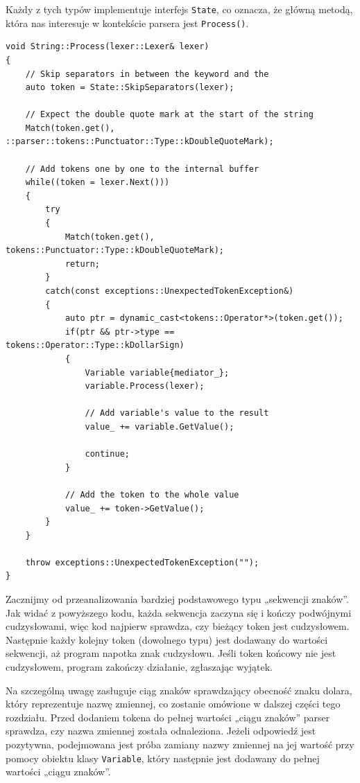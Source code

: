 Każdy z tych typów implementuje interfejs \texttt{State}, co oznacza, że główną metodą, która nas interesuje w kontekście parsera jest \texttt{Process()}.

\begin{lstlisting}[label=list:string,caption=Metoda String::Process(),basicstyle=\footnotesize\ttfamily]
void String::Process(lexer::Lexer& lexer)
{
    // Skip separators in between the keyword and the
    auto token = State::SkipSeparators(lexer);

    // Expect the double quote mark at the start of the string
    Match(token.get(), ::parser::tokens::Punctuator::Type::kDoubleQuoteMark);
    
    // Add tokens one by one to the internal buffer
    while((token = lexer.Next()))
    {
        try
        {
            Match(token.get(), tokens::Punctuator::Type::kDoubleQuoteMark);
            return;
        }
        catch(const exceptions::UnexpectedTokenException&)
        {
            auto ptr = dynamic_cast<tokens::Operator*>(token.get());
            if(ptr && ptr->type == tokens::Operator::Type::kDollarSign)
            {
                Variable variable{mediator_};
                variable.Process(lexer);
    
                // Add variable's value to the result
                value_ += variable.GetValue();
    
                continue;
            }
    
            // Add the token to the whole value
            value_ += token->GetValue();
        }
    }
    
    throw exceptions::UnexpectedTokenException("");
}
\end{lstlisting}

Zacznijmy od przeanalizowania bardziej podstawowego typu „sekwencji znaków”. Jak widać z powyższego kodu, każda sekwencja zaczyna się i kończy podwójnymi cudzysłowami, więc kod najpierw sprawdza, czy bieżący token jest cudzysłowem. Następnie każdy kolejny token (dowolnego typu) jest dodawany do wartości sekwencji, aż program napotka znak cudzysłowu. Jeśli token końcowy nie jest cudzysłowem, program zakończy działanie, zgłaszając wyjątek.

Na szczególną uwagę zasługuje ciąg znaków sprawdzający obecność znaku dolara, który reprezentuje nazwę zmiennej, co zostanie omówione w dalszej części tego rozdziału. Przed dodaniem tokena do pełnej wartości „ciągu znaków” parser sprawdza, czy nazwa zmiennej została odnaleziona. Jeżeli odpowiedź jest pozytywna, podejmowana jest próba zamiany nazwy zmiennej na jej wartość przy pomocy obiektu klasy \texttt{Variable}, który następnie jest dodawany do pełnej wartości „ciągu znaków”.


